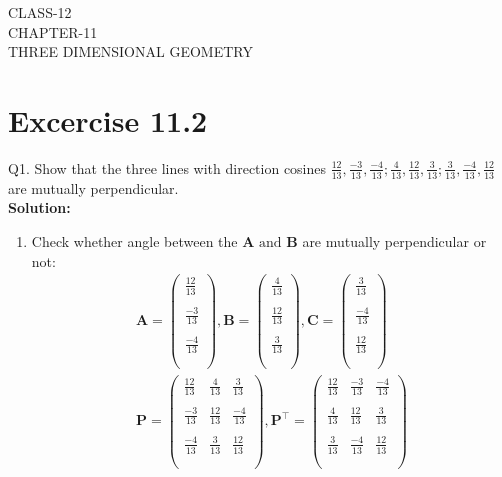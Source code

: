 \documentclass[12pt]{article}
\newcommand{\solution}{\noindent \textbf{Solution: }}
\newcommand{\myvec}[1]{\ensuremath{\begin{pmatrix}#1\end{pmatrix}}}
\let\vec\mathbf
\begin{document}
\begin{center}
\textbf\large{CLASS-12 \\ CHAPTER-11 \\ THREE DIMENSIONAL GEOMETRY}
\end{center}
\section*{Excercise 11.2}

Q1. Show that the three lines with direction cosines $\frac{12}{13}, \frac{-3}{13}, \frac{-4}{13}; \frac{4}{13}, \frac{12}{13}, \frac{3}{13}; \frac{3}{13}, \frac{-4}{13}, \frac{12}{13}$ are mutually perpendicular.
\\
\solution
\begin{enumerate}
\item Check whether angle between the $\vec{A} \text{ and } \vec{B}$ are mutually perpendicular or not:
		\begin{align}
		\vec{A}=\myvec{\frac{12}{13}\\\\\frac{-3}{13}\\\\\frac{-4}{13}\\\\},\vec{B}=\myvec{\frac{4}{13}\\\\\frac{12}{13}\\\\\frac{3}{13}\\\\},\vec{C}=\myvec{\frac{3}{13}\\\\\frac{-4}{13}\\\\\frac{12}{13}\\\\}\\
	\vec{P}=\myvec{\frac{12}{13}&\frac{4}{13}    &\frac{3}{13}\\\\ \frac{-3}{13}&\frac{12}{13}&\frac{-4}{13}\\\\ \frac{-4}{13}&\frac{3}{13}&\frac{12}{13}\\\\},\vec{P}^\top=\myvec{\frac{12}{13}&\frac{-3}{13}   &\frac{-4}{13}\\\\ \frac{4}{13}&\frac{12}{13}&\frac{3}{13}\\\\ \frac{3}{13}&\frac{-4}{13}&\frac{12}{13}\\\\}

\end{align}
\end{enumerate}
\end{document}
